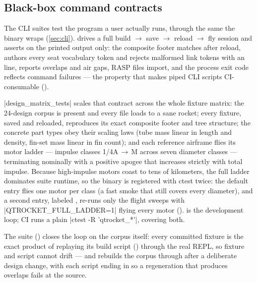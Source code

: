 \subsection{Black-box command contracts}\label{sec:verification-cli}

The CLI suites test the program a user actually runs, through the same  the
 binary wraps (\cref{sec:cli}).  drives a full
build $\to$ save $\to$ reload $\to$ fly session and asserts on the printed output only: the
composite footer matches after reload,  authors every seat vocabulary token and
rejects malformed link tokens with an  line,  reports overlaps and
air gaps, RASP  files import, and the process exit code reflects command failures ---
the property that makes piped CLI scripts CI-consumable
().

\cppinline|design_matrix_tests| scales that contract across the whole fixture matrix: the 24-design
corpus is present and every file loads to a sane rocket; every fixture, saved and reloaded,
reproduces its exact composite footer and tree structure; the concrete part types obey their
scaling laws (tube mass linear in length and density, fin-set mass linear in fin count); and each
reference airframe flies its motor ladder --- impulse classes \mbox{1/4A}$\,\to\,$M across seven
diameter classes --- terminating nominally with a positive apogee that increases strictly with
total impulse. Because high-impulse motors coast to tens of kilometers, the full ladder dominates
suite runtime, so the binary is registered with ctest twice: the default entry flies one motor
per class (a fast smoke that still covers every diameter), and a second entry, labeled
, re-runs only the flight sweeps with \cppinline|QTROCKET_FULL_LADDER=1| flying every
motor ().  is the development loop; CI runs a
plain \cppinline|ctest -R 'qtrocket_*'|, covering both.

The  suite () closes the loop on the
corpus itself: every committed fixture is the exact product of replaying its build script
() through the real REPL, so fixture and script cannot drift --- and  rebuilds
the corpus through  after a deliberate design change, with each script ending
in  so a regeneration that produces overlaps fails at the source.

